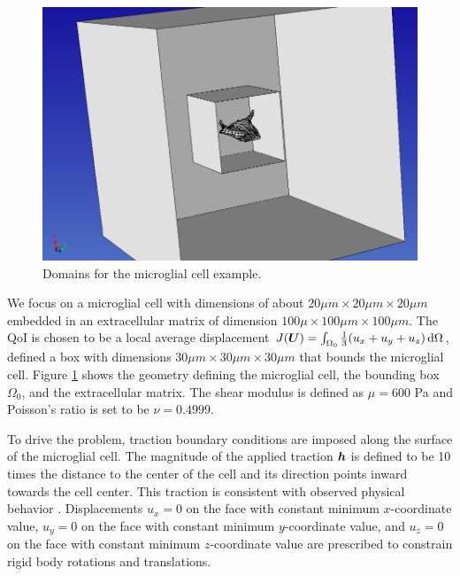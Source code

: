 %
\begin{figure}[ht!]
\centering
\includegraphics[width=.5\linewidth]{img/aut_glial_geom.png}
\caption{Domains for the microglial cell example.}
\label{fig:aut_glial_geom}
\end{figure}

We focus on a microglial cell with dimensions of about
$20 \mu m \times 20 \mu m \times 20 \mu m$ embedded in an extracellular
matrix of dimension $100 \mu \times 100 \mu m \times 100 \mu m$.
The QoI is chosen to be a local average displacement
$J(\boldsymbol{U}) = \int_{\Omega_0} \frac13 (u_x + u_y + u_z) \, \text{d} \Omega$,
defined a box with dimensions $30 \mu m \times 30 \mu m \times 30 \mu m$
that bounds the microglial cell. Figure \ref{fig:aut_glial_geom} shows
the geometry defining the microglial cell, the bounding box
$\Omega_0$, and the extracellular matrix. The shear modulus
is defined as $\mu = 600$ Pa and Poisson's ratio is set to be
$\nu = 0.4999$.

To drive the problem, traction boundary conditions are imposed along
the surface of the microglial cell. The magnitude of the applied
traction $\boldsymbol{h}$ is defined to be 10 times the distance to the
center of the cell and its direction points inward towards the
cell center. This traction is consistent with observed physical
behavior \cite{dong2017recovery}. Displacements $u_x = 0$
on the face with constant minimum $x$-coordinate value, $u_y = 0$ on
the face with constant minimum $y$-coordinate value, and $u_z = 0$ on
the face with constant minimum $z$-coordinate value are prescribed
to constrain rigid body rotations and translations.

